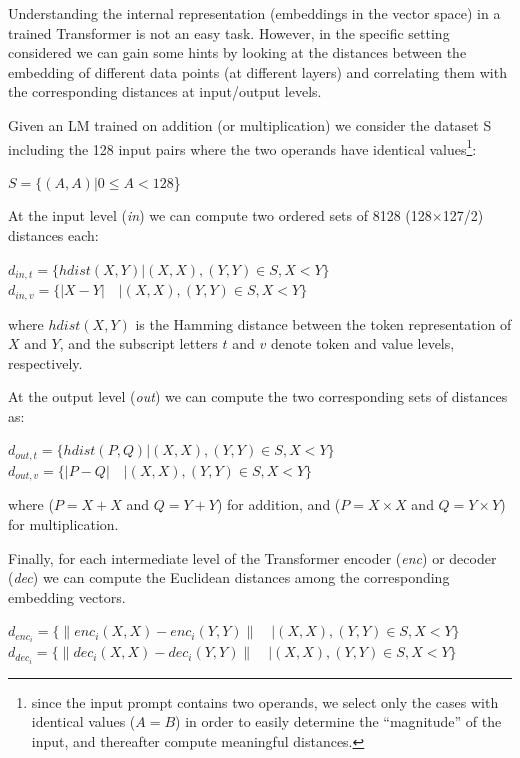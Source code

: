 \documentclass[final,1p,times,authoryear]{elsarticle}
\begin{document}
Understanding the internal representation (embeddings in the vector space) in a trained Transformer is not an easy task. However, in the specific setting considered we can gain some hints by looking at the distances between the embedding of different data points (at different layers) and correlating them with the corresponding distances at input/output levels.

Given an LM trained on addition (or multiplication) we consider the dataset S including the 128 input pairs where the two operands have identical values\footnote{since the input prompt contains two operands, we select only the cases with identical values ($A=B$) in order to easily determine the “magnitude” of the input, and thereafter compute meaningful distances.}:

\begin{center}
$S=\{(A,A)|0 \leq A < 128$\}
\end{center}

At the input level (\textit{in}) we can compute two ordered sets of 8128 (128×127/2) distances each:

\begin{center}
$d_{in,t}=\{hdist(X,Y)|(X,X),(Y,Y) \in S,X<Y\}$
$d_{in,v}=\{|X-Y| \quad |(X,X),(Y,Y) \in S,X<Y\}$
\end{center}

where $hdist(X,Y)$ is the Hamming distance between the token representation of $X$ and $Y$, and the subscript letters $t$ and $v$ denote token and value levels, respectively.

At the output level (\textit{out}) we can compute the two corresponding sets of distances as:

\begin{center}
$d_{out,t}=\{hdist(P,Q)|(X,X),(Y,Y) \in S,X<Y\}$
$d_{out,v}=\{|P-Q| \quad |(X,X),(Y,Y) \in S,X<Y\}$
\end{center}

where ($P=X+X$ and $Q=Y+Y$) for addition, and ($P=X \times X$ and $Q=Y \times Y$) for multiplication.

Finally, for each intermediate level of the Transformer encoder (\textit{enc}) or decoder (\textit{dec}) we can compute the Euclidean distances among the corresponding embedding vectors. 

\begin{center}
$d_{enc_i}=\{\|enc_i(X,X)-enc_i(Y,Y)\| \quad |(X,X),(Y,Y) \in S,X<Y\}$
$d_{dec_i}=\{\|dec_i(X,X)-dec_i(Y,Y)\| \quad |(X,X),(Y,Y) \in S,X<Y\}$
\end{center}
\end{document}
